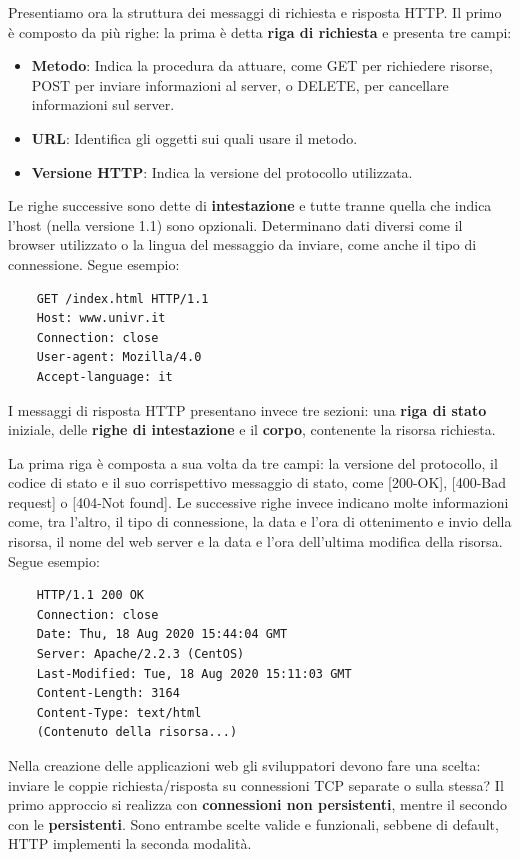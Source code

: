 \noindent Presentiamo ora la struttura dei messaggi di richiesta e risposta HTTP. Il primo è composto da più righe: la prima è detta \textbf{riga di richiesta} e presenta tre campi: \begin{itemize}
	\item \textbf{Metodo}: Indica la procedura da attuare, come GET per richiedere risorse, POST per inviare informazioni al server, o DELETE, per cancellare informazioni sul server.
	\item \textbf{URL}: Identifica gli oggetti sui quali usare il metodo.
	\item \textbf{Versione HTTP}: Indica la versione del protocollo utilizzata.
\end{itemize}
\noindent Le righe successive sono dette di \textbf{intestazione} e tutte tranne quella che indica l'host (nella versione 1.1) sono opzionali. Determinano dati diversi come il browser utilizzato o la lingua del messaggio da inviare, come anche il tipo di connessione. Segue esempio: \begin{verbatim}
	GET /index.html HTTP/1.1
	Host: www.univr.it
	Connection: close
	User-agent: Mozilla/4.0
	Accept-language: it
\end{verbatim}
\noindent I messaggi di risposta HTTP presentano invece tre sezioni: una \textbf{riga di stato} iniziale, delle \textbf{righe di intestazione} e il \textbf{corpo}, contenente la risorsa richiesta.\par
La prima riga è composta a sua volta da tre campi: la versione del protocollo, il codice di stato e il suo corrispettivo messaggio di stato, come [200-OK], [400-Bad request] o [404-Not found]. Le successive righe invece indicano molte informazioni come, tra l'altro, il tipo di connessione, la data e l'ora di ottenimento e invio della risorsa, il nome del web server e la data e l'ora dell'ultima modifica della risorsa. Segue esempio: \begin{verbatim}
	HTTP/1.1 200 OK
	Connection: close
	Date: Thu, 18 Aug 2020 15:44:04 GMT
	Server: Apache/2.2.3 (CentOS)
	Last-Modified: Tue, 18 Aug 2020 15:11:03 GMT
	Content-Length: 3164
	Content-Type: text/html
	(Contenuto della risorsa...)
\end{verbatim}
\noindent Nella creazione delle applicazioni web gli sviluppatori devono fare una scelta: inviare le coppie richiesta/risposta su connessioni TCP separate o sulla stessa? Il primo approccio si realizza con \textbf{connessioni non persistenti}, mentre il secondo con le \textbf{persistenti}. Sono entrambe scelte valide e funzionali, sebbene di default, HTTP implementi la seconda modalità.\par
